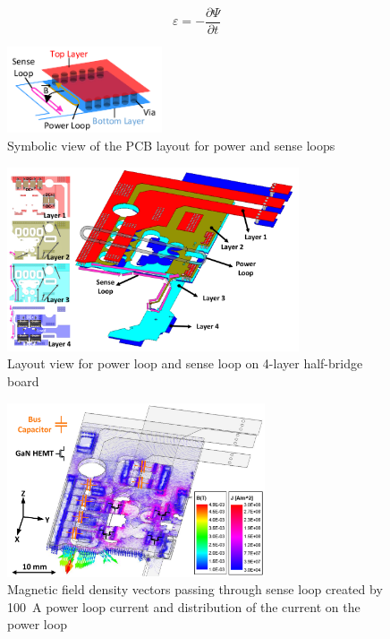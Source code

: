 \documentclass[journal]{IEEEtran}
\begin{document}
\begin{equation}
\label{eq_lenz}
    \varepsilon = -\dfrac{\partial \Psi}{\partial t}
\end{equation}



\begin{figure}[!t]
\centering
\includegraphics[width=1.8in]{Figures/Fig5-SymbolicLayout.pdf}
\caption{Symbolic view of the PCB layout for power and sense loops}
\label{fig_SymbolicLayout}
\end{figure}

\begin{figure}
\centering
\includegraphics[width=3.4in]{Figures/Fig6-LayoutDrawing.pdf}
\caption{Layout view for power loop and sense loop on 4-layer half-bridge board}
\label{fig_pcbfea}
\end{figure}

\begin{figure}[!t]
\centering
\includegraphics[width=3in]{Figures/Fig7-FEA.pdf}
\caption{Magnetic field density vectors passing through sense loop created by 100~A power loop current and distribution of the current on the power loop}
\label{fig_senseBvector}
\end{figure}
\end{document}
